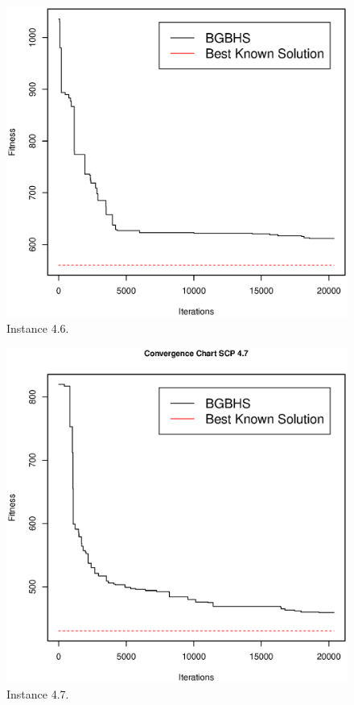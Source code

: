 \begin{figure}[]
\centering
\includegraphics[scale=.45]{Resultados/scp46.eps}
\caption{Instance 4.6.}
\label{fig:Instance.4.6}
\end{figure}

\begin{figure}[]
\centering
\includegraphics[scale=.45]{Resultados/scp47.eps}
\caption{Instance 4.7.}
\label{fig:Instance.4.7}
\end{figure}

